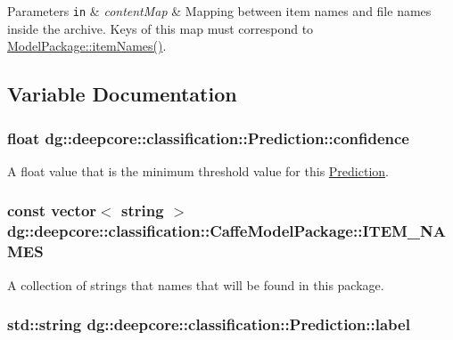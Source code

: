 \begin{DoxyParams}[1]{Parameters}
\mbox{\tt in}  & {\em content\+Map} & Mapping between item names and file names inside the archive. Keys of this map must correspond to \hyperlink{group___classification_module_gaa23ae021f838b2836c02dcc626bc1c8e}{Model\+Package\+::item\+Names()}. \\
\hline
\end{DoxyParams}


\subsection{Variable Documentation}
\subsubsection[{\texorpdfstring{confidence}{confidence}}]{\setlength{\rightskip}{0pt plus 5cm}float dg\+::deepcore\+::classification\+::\+Prediction\+::confidence}\hypertarget{group___classification_module_gae7ab1c3906399dab0ee969ffc521bcfb}{}\label{group___classification_module_gae7ab1c3906399dab0ee969ffc521bcfb}


A float value that is the minimum threshold value for this \hyperlink{structdg_1_1deepcore_1_1classification_1_1_prediction}{Prediction}. 

\subsubsection[{\texorpdfstring{I\+T\+E\+M\+\_\+\+N\+A\+M\+ES}{ITEM_NAMES}}]{\setlength{\rightskip}{0pt plus 5cm}const vector$<$ string $>$ dg\+::deepcore\+::classification\+::\+Caffe\+Model\+Package\+::\+I\+T\+E\+M\+\_\+\+N\+A\+M\+ES\hspace{0.3cm}{\ttfamily [static]}}\hypertarget{group___classification_module_ga44a441d13d149f42cc659ee92e83fdb4}{}\label{group___classification_module_ga44a441d13d149f42cc659ee92e83fdb4}


A collection of strings that names that will be found in this package. 

\subsubsection[{\texorpdfstring{label}{label}}]{\setlength{\rightskip}{0pt plus 5cm}std\+::string dg\+::deepcore\+::classification\+::\+Prediction\+::label}\hypertarget{group___classification_module_gae1374a898e2380401c2e671786e69ff1}{}\label{group___classification_module_gae1374a898e2380401c2e671786e69ff1}


